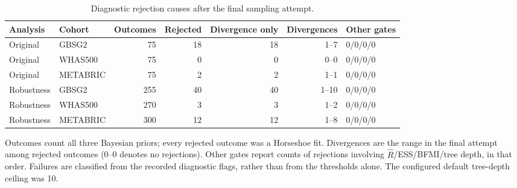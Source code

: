 \begin{table}[htbp]
\centering
\begingroup\singlespacing\footnotesize
\setlength{\tabcolsep}{3pt}
\caption{Diagnostic rejection causes after the final sampling attempt.}\label{tab:exam-diagnostic-failures}
\begin{adjustbox}{max width=\textwidth}
\begin{tabular}{@{}llrrrrl@{}}
\toprule Analysis & Cohort & Outcomes & Rejected & Divergence only & Divergences & Other gates\\\midrule
Original & GBSG2 & 75 & 18 & 18 & 1--7 & 0/0/0/0\\
Original & WHAS500 & 75 & 0 & 0 & 0--0 & 0/0/0/0\\
Original & METABRIC & 75 & 2 & 2 & 1--1 & 0/0/0/0\\
Robustness & GBSG2 & 255 & 40 & 40 & 1--10 & 0/0/0/0\\
Robustness & WHAS500 & 270 & 3 & 3 & 1--2 & 0/0/0/0\\
Robustness & METABRIC & 300 & 12 & 12 & 1--8 & 0/0/0/0\\
\bottomrule
\end{tabular}
\end{adjustbox}
\par\smallskip
\begin{minipage}{\textwidth}
Outcomes count all three Bayesian priors; every rejected outcome was a Horseshoe fit. Divergences are the range in the final attempt among rejected outcomes (0--0 denotes no rejections). Other gates report counts of rejections involving $\widehat R$/ESS/BFMI/tree depth, in that order. Failures are classified from the recorded diagnostic flags, rather than from the thresholds alone. The configured default tree-depth ceiling was 10.
\end{minipage}
\endgroup
\end{table}
